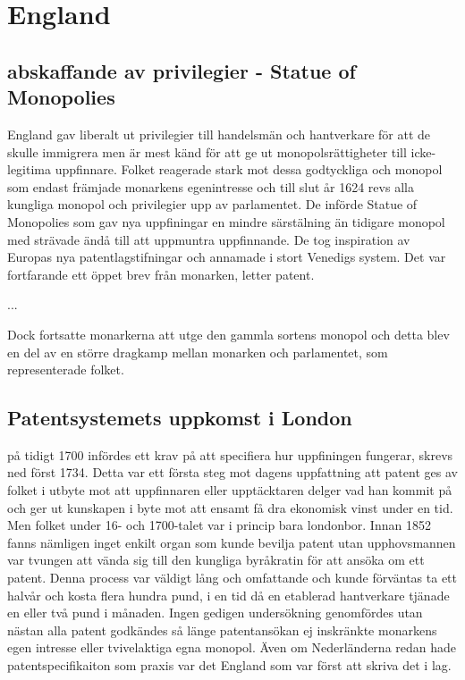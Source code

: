 \section{England} %
\label{sec:england}

\subsection{abskaffande av privilegier - Statue of Monopolies} %
\label{sub:abskaffande_av_privilegier_statue_of_monopolies}



England gav liberalt ut privilegier till handelsmän och hantverkare för att de skulle immigrera men är mest känd för att ge ut monopolsrättigheter till icke-legitima uppfinnare. 
Folket reagerade stark mot dessa godtyckliga och monopol som endast främjade monarkens egenintresse och till slut år 1624 revs alla kungliga monopol och privilegier upp av parlamentet. 
De införde Statue of Monopolies som gav nya uppfiningar en mindre särstälning än tidigare monopol med strävade ändå till att uppmuntra uppfinnande. 
De tog inspiration av Europas nya patentlagstifningar och annamade i stort Venedigs system. 
Det var fortfarande ett öppet brev från monarken, letter patent.

...

Dock fortsatte monarkerna att utge den gammla sortens monopol och detta blev en del av en större dragkamp mellan monarken och parlamentet, som representerade folket. 


\subsection{Patentsystemets uppkomst i London} %
\label{sub:patentsystemets_uppkomst_i_london}


på tidigt 1700 infördes ett krav på att specifiera hur uppfiningen fungerar, skrevs ned först 1734. Detta var ett första steg mot dagens uppfattning att patent ges av folket i utbyte mot att uppfinnaren eller upptäcktaren delger vad han kommit på och ger ut kunskapen i byte mot att ensamt få dra ekonomisk vinst under en tid. Men folket under 16- och 1700-talet var i princip bara londonbor. Innan 1852 fanns nämligen inget enkilt organ som kunde bevilja patent utan upphovsmannen var tvungen att vända sig till den kungliga byråkratin för att ansöka om ett patent. Denna process var väldigt lång och omfattande och kunde förväntas ta ett halvår och kosta flera hundra pund, i en tid då en etablerad hantverkare tjänade en eller två pund i månaden. Ingen gedigen undersökning genomfördes utan nästan alla patent godkändes så länge patentansökan ej inskränkte monarkens egen intresse eller tvivelaktiga egna monopol. Även om Nederländerna redan hade patentspecifikaiton som praxis var det England som var först att skriva det i lag. 

